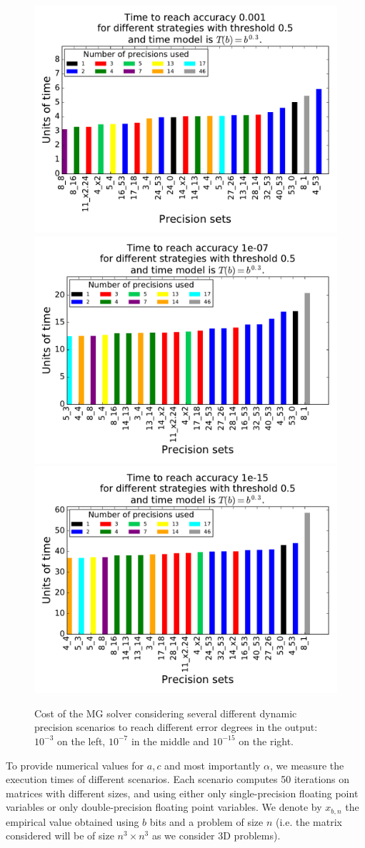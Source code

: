\begin{figure}
    \includegraphics[width=0.33\linewidth]{figs/cost_3.pdf}
    \includegraphics[width=0.33\linewidth]{figs/cost_7.pdf}
    \includegraphics[width=0.33\linewidth]{figs/cost_15.pdf}
    \caption{Cost of the MG solver considering several different dynamic
    precision scenarios to reach different error degrees in the output:
    $10^{-3}$ on the left, $10^{-7}$ in the middle and $10^{-15}$ on the
    right.}
    \label{fig.estimation1}
\end{figure}

To provide numerical values for $a,c$ and most importantly $\alpha$, we measure
the execution times of different scenarios. Each scenario computes 50
iterations on matrices with different sizes, and using either only
single-precision floating point variables or only double-precision floating
point variables. We denote by $x_{b,n}$ the empirical value obtained using $b$
bits and a problem of size $n$ (i.e. the matrix considered will be of size $n^3
\times n^3$ as we consider 3D problems).


